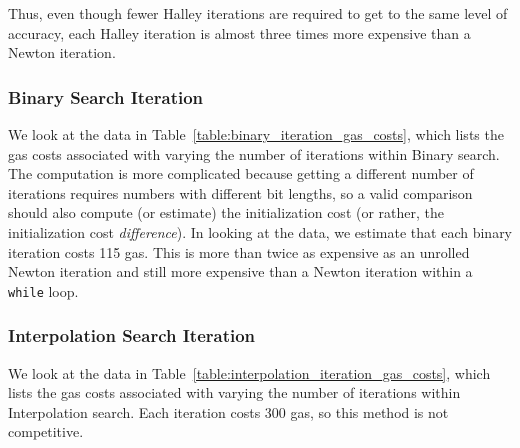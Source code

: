 Thus, even though fewer Halley iterations are required
to get to the same level of accuracy,
each Halley iteration is almost three times more expensive
than a Newton iteration.

\subsubsection{Binary Search Iteration}
\label{app_gas_costs:binary_search}

We look at the data in Table~\ref{table:binary_iteration_gas_costs},
which lists the gas costs associated with varying
the number of iterations within Binary search.
The computation is more complicated because getting a different
number of iterations requires numbers with different bit lengths,
so a valid comparison should also compute (or estimate) the initialization
cost (or rather, the initialization cost \emph{difference}).
In looking at the data, we estimate that each binary iteration
costs 115 gas.
This is more than twice as expensive as an unrolled Newton iteration
and still more expensive than a Newton iteration within a \texttt{while} loop.

\subsubsection{Interpolation Search Iteration}
\label{app_gas_costs:interpolation_search}

We look at the data in Table~\ref{table:interpolation_iteration_gas_costs},
which lists the gas costs associated with varying
the number of iterations within Interpolation search.
Each iteration costs 300 gas,
so this method is not competitive.
